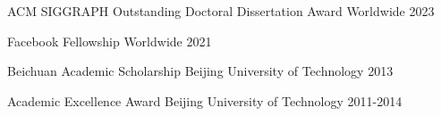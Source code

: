 

\begin{cvhonors}

  \cvhonor
	{ACM SIGGRAPH Outstanding Doctoral Dissertation Award}
	{}
	{Worldwide}
	{2023}

  \cvhonor
  	{Facebook Fellowship}
  	{}
  	{Worldwide}
  	{2021}

  \cvhonor
	{Beichuan Academic Scholarship}
	{}
	{Beijing University of Technology}
	{2013} 
  
  \cvhonor
 	{Academic Excellence Award}
 	{}
 	{Beijing University of Technology}
 	{2011-2014} 
  
 
  	
  	

\end{cvhonors}
